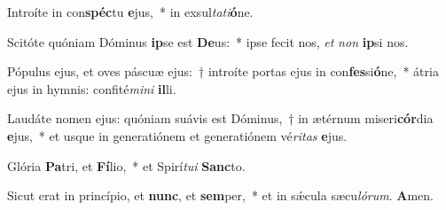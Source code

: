 Introíte in con\textbf{spéc}tu \textbf{e}jus,~* in exsul\textit{ta}\textit{ti}\textbf{ó}ne.

Scitóte quóniam Dóminus \textbf{ip}se est \textbf{De}us:~* ipse fecit nos, \textit{et} \textit{non} \textbf{ip}si nos.

Pópulus ejus, et oves páscuæ ejus:~† introíte portas ejus in con\textbf{fes}si\textbf{ó}ne,~* átria ejus in hymnis: confité\textit{mi}\textit{ni} \textbf{il}li.

Laudáte nomen ejus: quóniam suávis est Dóminus,~† in ætérnum miseri\textbf{cór}dia \textbf{e}jus,~* et usque in generatiónem et generatiónem vé\textit{ri}\textit{tas} \textbf{e}jus.

Glória \textbf{Pa}tri, et \textbf{Fí}lio,~* et Spirí\textit{tu}\textit{i} \textbf{Sanc}to.

Sicut erat in princípio, et \textbf{nunc}, et \textbf{sem}per,~* et in sǽcula sæcu\textit{ló}\textit{rum}. \textbf{A}men.
